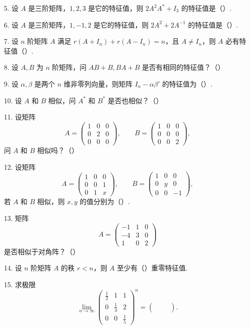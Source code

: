 \documentclass[UTF8,12pt,a4paper,fontset=fandol]{ctexart}
\begin{document}
5. 设 $A$ 是三阶矩阵，$1,2,3$ 是它的特征值，则 $2A^2A^*+I_3$ 的特征值是（\quad ）.

6. 设 $A$ 是三阶矩阵，$1,-1,2$ 是它的特征值，则 $2A^2+2A^{-1}$ 的特征值是（\quad ）.

7. 设 $n$ 阶矩阵 $A$ 满足 $r(A+I_n)+r(A-I_n)=n$，且 $A\ne I_n$，则 $A$ 必有特征值（\quad ）.

8. 设 $A,B$ 为 $n$ 阶矩阵，问 $AB+B,BA+B$ 是否有相同的特征值？（\quad ）

9. 设 $\alpha,\beta$ 是两个 $n$ 维非零列向量，则矩阵 $I_n-\alpha\beta'$ 的特征值为（\quad ）.

10. 设 $A$ 和 $B$ 相似，问 $A^*$ 和 $B^*$ 是否也相似？（\quad ）

11. 设矩阵
\[
A=\begin{pmatrix}1&0&0\\0&2&0\\0&0&0\end{pmatrix},\qquad
B=\begin{pmatrix}1&0&0\\0&0&0\\0&0&2\end{pmatrix},
\]
问 $A$ 和 $B$ 相似吗？（\quad ）

12. 设矩阵
\[
A=\begin{pmatrix}1&0&0\\0&0&1\\0&1&x\end{pmatrix},\qquad
B=\begin{pmatrix}1&0&0\\0&y&0\\0&0&-1\end{pmatrix},
\]
若 $A$ 和 $B$ 相似，则 $x,y$ 的值分别为（\quad ）.

13. 矩阵
\[
A=\begin{pmatrix}-1&1&0\\-4&3&0\\1&0&2\end{pmatrix}
\]
是否相似于对角阵？（\quad ）

14. 设 $n$ 阶矩阵 $A$ 的秩 $r<n$，则 $A$ 至少有（\quad ）重零特征值.

15. 求极限
\[
\lim_{n\to\infty}
\begin{pmatrix}
\frac12&1&1\\
0&\frac13&2\\
0&0&\frac15
\end{pmatrix}^n
=
\begin{pmatrix}
&&\\
&&\\
&&
\end{pmatrix}.
\]
\end{document}

